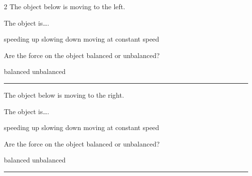 \documentclass[]{exam}
\begin{document}
\begin{questions}
\begin{multicols*}{2}
\question \label{ayuwJ}
The object below is moving to the left.

\begin{center}
\end{center}

The object is\dots .

\begin{randomizechoices}[norandomize]
    \choice speeding up
    \choice slowing down
    \correctchoice moving at constant speed 
\end{randomizechoices}

\question \label{vYsXn}
Are the force on the object balanced or unbalanced?

\begin{randomizechoices}[norandomize]
    \correctchoice balanced
    \choice unbalanced
\end{randomizechoices}

\bigskip
\hrule



\vspace*{\fill}
\columnbreak


\question 
The object below is moving to the right.

\begin{center}
\end{center}

The object is\dots .

\begin{randomizechoices}[norandomize]
    \choice speeding up
    \correctchoice slowing down
    \choice moving at constant speed 
\end{randomizechoices}

\question 
Are the force on the object balanced or unbalanced?

\begin{randomizechoices}[norandomize]
    \choice balanced
    \correctchoice unbalanced
\end{randomizechoices}

\bigskip
\hrule


\end{multicols*}
\end{questions}
\end{document}

